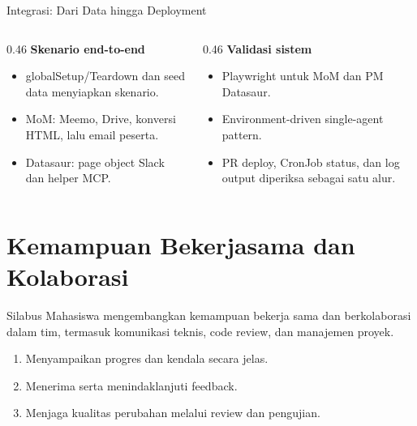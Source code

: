 \begin{comparisonframe}{Integrasi: Dari Data hingga Deployment}
    \begin{columns}[T,onlytextwidth]
        \begin{column}{0.46\textwidth}
            \textbf{Skenario end-to-end}\par
            \begin{itemize}\setlength{\itemsep}{3pt}
                \item globalSetup/Teardown dan seed data menyiapkan skenario.
                \item MoM: Meemo, Drive, konversi HTML, lalu email peserta.
                \item Datasaur: page object Slack dan helper MCP.
            \end{itemize}
        \end{column}
        \begin{column}{0.46\textwidth}
            \textbf{Validasi sistem}\par
            \begin{itemize}\setlength{\itemsep}{3pt}
                \item Playwright untuk MoM dan PM Datasaur.
                \item Environment-driven single-agent pattern.
                \item PR deploy, CronJob status, dan log output diperiksa sebagai satu alur.
            \end{itemize}
        \end{column}
    \end{columns}
\end{comparisonframe}

\section{Kemampuan Bekerjasama dan Kolaborasi}

\begin{contentframe}{Silabus}
    \small
    Mahasiswa mengembangkan kemampuan bekerja sama dan berkolaborasi dalam tim, termasuk komunikasi teknis, code review, dan manajemen proyek.
    \begin{enumerate}\setlength{\itemsep}{4pt}
        \item Menyampaikan progres dan kendala secara jelas.
        \item Menerima serta menindaklanjuti feedback.
        \item Menjaga kualitas perubahan melalui review dan pengujian.
    \end{enumerate}
\end{contentframe}

